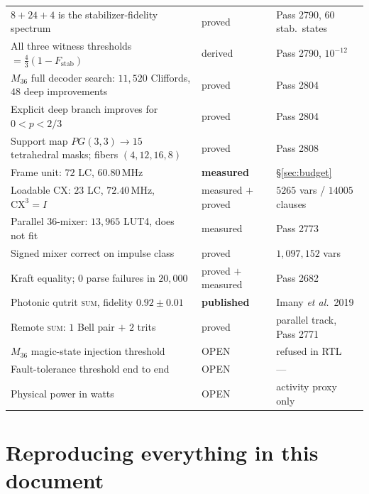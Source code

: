 {\begin{center}
\begin{tabular}{@{}p{8.6cm}p{2.5cm}p{4.0cm}@{}}
$8{+}24{+}4$ is the stabilizer-fidelity spectrum & proved & Pass 2790, 60 stab.\ states\\
All three witness thresholds $=\frac43(1-F_{\mathrm{stab}})$ & derived & Pass 2790, $10^{-12}$\\
$M_{36}$ full decoder search: $11{,}520$ Cliffords, $48$ deep improvements & proved & Pass 2804\\
Explicit deep branch improves for $0<p<2/3$ & proved & Pass 2804\\
Support map $PG(3,3)\to15$ tetrahedral masks; fibers $(4,12,16,8)$ & proved & Pass 2808\\
Frame unit: $72$ LC, $60.80$\,MHz & \textbf{measured} & \S\ref{sec:budget}\\
Loadable CX: $23$ LC, $72.40$\,MHz, $\mathrm{CX}^3{=}I$ & measured $+$ proved &
   $5265$ vars / $14005$ clauses\\
Parallel $36$-mixer: $13{,}965$ LUT4, does not fit & measured & Pass 2773\\
Signed mixer correct on impulse class & proved & $1{,}097{,}152$ vars\\
Kraft equality; $0$ parse failures in $20{,}000$ & proved $+$ measured & Pass 2682\\
Photonic qutrit \textsc{sum}, fidelity $0.92\pm0.01$ & \textbf{published} &
   Imany \emph{et al.}\ 2019\\
Remote \textsc{sum}: $1$ Bell pair $+$ $2$ trits & proved & parallel track, Pass 2771\\
\midrule
$M_{36}$ magic-state injection threshold & \textcolor{bad}{OPEN} & refused in RTL\\
Fault-tolerance threshold end to end & \textcolor{bad}{OPEN} & --- \\
Physical power in watts & \textcolor{bad}{OPEN} & activity proxy only\\
\bottomrule
\end{tabular}
\end{center}}

\section{Reproducing everything in this document}

